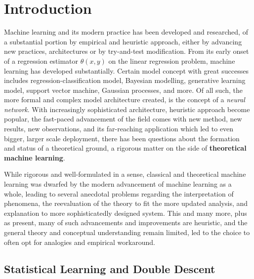 \section{Introduction}

Machine learning and its modern practice has been developed and researched, of a substantial portion by empirical and heuristic approach, either by advancing new practices, architectures or by try-and-test modification. From its early onset of a regression estimator $\theta(x,y)$ on the linear regression problem, machine learning has developed substantially. Certain model concept with great successes includes regression-classification model, Bayesian modelling, generative learning model, support vector machine, Gaussian processes, and more. Of all such, the more formal and complex model architecture created, is the concept of a \textit{neural network}. With increasingly sophisticated architecture, heuristic approach become popular, the fast-paced advancement of the field comes with new method, new results, new observations, and its far-reaching application which led to even bigger, larger scale deployment, there has been questions about the formation and status of a theoretical ground, a rigorous matter on the side of \textbf{theoretical machine learning}.

While rigorous and well-formulated in a sense, classical and theoretical machine learning was dwarfed by the modern advancement of machine learning as a whole, leading to several anecdotal problems regarding the interpretation of phenomena, the reevaluation of the theory to fit the more updated analysis, and explanation to more sophisticatedly designed system. This and many more, plus as present, many of such advancements and improvements are heuristic, and the general theory and conceptual understanding remain limited, led to the choice to often opt for analogies and empirical workaround.

\subsection{Statistical Learning and Double Descent}

